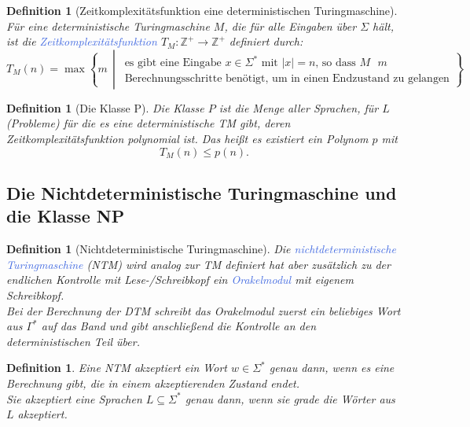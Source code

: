 \documentclass[11pt]{article}
\newcommand{\tcol}[1]{\textcolor{RoyalBlue}{#1}}
\newcommand{\set}[1]{\left\lbrace #1\right\rbrace}
\theoremstyle{break}
\newtheorem{defi}[satz]{Definition}
\begin{document}
    \begin{defi}[Zeitkomplexitätsfunktion eine deterministischen Turingmaschine]
        Für eine deterministische Turingmaschine $M$, die für alle Eingaben über $\Sigma$ hält, ist die \tcol{Zeitkomplexitätsfunktion} $T_M\colon\mathbb{Z}^+\to\mathbb{Z}^+$ definiert durch:
        \[
            T_M(n)=\max\set{m\,\middle|\,
            \begin{array}{c}
                \text{es gibt eine Eingabe $x\in\Sigma^*$ mit $|x|=n$, so dass $M$ $m$}\\
                \text{Berechnungsschritte benötigt, um in einen Endzustand zu gelangen}
            \end{array}}
        \]
    \end{defi}

    \begin{defi}[Die Klasse P]
        Die Klasse $P$ ist die Menge aller Sprachen, für $L$ (Probleme) für die es eine deterministische TM gibt, deren Zeitkomplexitätsfunktion polynomial ist.
        Das heißt es existiert ein Polynom $p$ mit\[T_M(n)\leq p(n).\]
    \end{defi}


    \subsection{Die Nichtdeterministische Turingmaschine und die Klasse NP}
	\label{subsec:die-nichtdeterministische-turingmaschineindexund-die-klasse-npindex}

    \begin{defi}[Nichtdeterministische Turingmaschine]
        Die \tcol{nichtdeterministische Turingmaschine} (NTM) wird analog zur TM definiert hat aber zusätzlich zu der endlichen Kontrolle mit Lese-/Schreibkopf ein \tcol{Orakelmodul} mit eigenem Schreibkopf.\\
        Bei der Berechnung der DTM schreibt das Orakelmodul zuerst ein beliebiges Wort aus $\Gamma^*$ auf das Band und gibt anschließend die Kontrolle an den deterministischen Teil über.
    \end{defi}

    \begin{defi}
        Eine NTM akzeptiert ein Wort $w\in\Sigma^*$ genau dann, wenn es eine Berechnung gibt, die in einem akzeptierenden Zustand endet.\\
        Sie akzeptiert eine Sprachen $L\subseteq\Sigma^*$ genau dann, wenn sie grade die Wörter aus $L$ akzeptiert.
    \end{defi}
\end{document}
